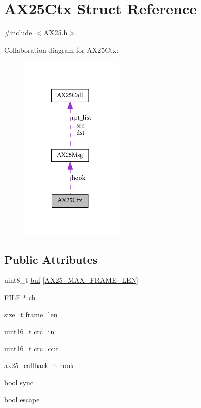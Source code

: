 \hypertarget{struct_a_x25_ctx}{}\section{A\+X25\+Ctx Struct Reference}
\label{struct_a_x25_ctx}


{\ttfamily \#include $<$A\+X25.\+h$>$}



Collaboration diagram for A\+X25\+Ctx\+:
\nopagebreak
\begin{figure}[H]
\begin{center}
\leavevmode
\includegraphics[width=140pt]{struct_a_x25_ctx__coll__graph}
\end{center}
\end{figure}
\subsection*{Public Attributes}
\begin{DoxyCompactItemize}
\item 
uint8\+\_\+t \hyperlink{struct_a_x25_ctx_aa1dc2643a8179b3a662cbe8b1e78433e}{buf} \mbox{[}\hyperlink{_a_x25_8h_a84c25cdacf7147bae59a835fe317c865}{A\+X25\+\_\+\+M\+A\+X\+\_\+\+F\+R\+A\+M\+E\+\_\+\+L\+EN}\mbox{]}
\item 
F\+I\+LE $\ast$ \hyperlink{struct_a_x25_ctx_a1e358851f9443aae7fb781c76044e62f}{ch}
\item 
size\+\_\+t \hyperlink{struct_a_x25_ctx_a4863474d8ded80b51d5cc1c2aff9f840}{frame\+\_\+len}
\item 
uint16\+\_\+t \hyperlink{struct_a_x25_ctx_acba5c6c48b277cd5520a4060abac3a63}{crc\+\_\+in}
\item 
uint16\+\_\+t \hyperlink{struct_a_x25_ctx_aea6a6b921e34e3ed514e4598a907adf1}{crc\+\_\+out}
\item 
\hyperlink{_a_x25_8h_a15689cdcc5425113afb9b0588d76c273}{ax25\+\_\+callback\+\_\+t} \hyperlink{struct_a_x25_ctx_aaf4149ca8e0ac15cb846f57b5a2056cd}{hook}
\item 
bool \hyperlink{struct_a_x25_ctx_a9ff9110cc05e86005aaab19c41aa3237}{sync}
\item 
bool \hyperlink{struct_a_x25_ctx_a2cf354b3ec66e851815667cf1ac43c06}{escape}
\end{DoxyCompactItemize}


